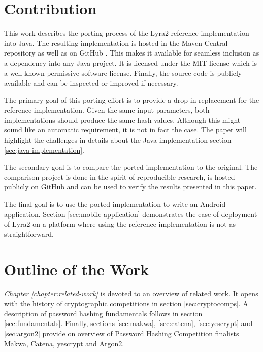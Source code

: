 \section{Contribution}
This work describes the porting process of the Lyra2 reference implementation into Java. The resulting implementation is hosted in the Maven Central repository \cite{maven:2017:lyra2} as well as on GitHub \cite{github:2017:lyra2-java}. This makes it available for seamless inclusion as a dependency into any Java project. It is licensed under the MIT license which is a well-known permissive software license. Finally, the source code is publicly available and can be inspected or improved if necessary.

The primary goal of this porting effort is to provide a drop-in replacement for the reference implementation. Given the same input parameters, both implementations should produce the same hash values. Although this might sound like an automatic requirement, it is not in fact the case. The paper will highlight the challenges in details about the Java implementation section \ref{sec:java-implementation}.

The secondary goal is to compare the ported implementation to the original. The comparison project is done in the spirit of reproducible research, is hosted publicly on GitHub \cite{github:2017:lyra2-compare} and can be used to verify the results presented in this paper.

The final goal is to use the ported implementation to write an Android application. Section \ref{sec:mobile-application} demonstrates the ease of deployment of Lyra2 on a platform where using the reference implementation is not as straightforward.

\section{Outline of the Work}

\emph{Chapter \ref{chapter:related-work}} is devoted to an overview of related work. It opens with the history of cryptographic competitions in section \ref{sec:cryptocomps}. A description of password hashing fundamentals follows in section \ref{sec:fundamentals}. Finally, sections \ref{sec:makwa}, \ref{sec:catena}, \ref{sec:yescrypt} and \ref{sec:argon2} provide on overview of Password Hashing Competition finalists Makwa, Catena, yescrypt and Argon2.

